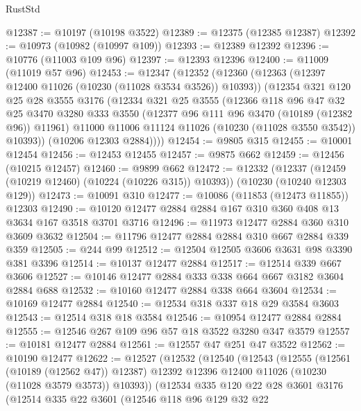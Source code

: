 \begin{lexlean}{RustStd}
\begin{coremodule}
@12387 := @10197 (@10198 @3522)
@12389 := @12375 (@12385 @12387)
@12392 := @10973 (@10982 (@10997 @109))
@12393 := @12389 @12392
@12396 := @10776 (@11003 @109 @96)
@12397 := @12393 @12396
@12400 := @11009 (@11019 @57 @96)
@12453 := @12347
    (@12352
      (@12360
        (@12363 (@12397 @12400 @11026 (@10230 (@11028 @3534 @3526)) @10393))
        (@12354
          @321
          @120
          @25
          @28
          @3555
          @3176
          (@12334
            @321
            @25
            @3555
            (@12366
              @118
              @96
              @47
              @32
              @25
              @3470
              @3280
              @333
              @3550
              (@12377 @96 @111 @96 @3470 (@10189 (@12382 @96)) @11961)
              @11000
              @11006
              @11124
              @11026
              (@10230 (@11028 @3550 @3542))
              @10393))
          (@10206 @12303 @2884))))
@12454 := @9805 @315
@12455 := @10001 @12454
@12456 := @12453 @12455
@12457 := @9875 @662
@12459 := @12456 (@10215 @12457)
@12460 := @9899 @662
@12472 := @12332
    (@12337 (@12459 (@10219 @12460) (@10224 (@10226 @315)) @10393))
    (@10230 (@10240 @12303 @129))
@12473 := @10091 @310
@12477 := @10086 (@11853 (@12473 @11855)) @12303
@12490 := @10120 @12477 @2884 @2884 @167 @310 @360 @408 @13 @3634 @167 @3518 @3701 @3716
@12496 := @11973 @12477 @2884 @360 @310 @3609 @3632
@12504 := @11796 @12477 @2884 @2884 @310 @667 @2884 @339 @359
@12505 := @244 @99
@12512 := @12504 @12505 @3606 @3631 @98 @3390 @381 @3396
@12514 := @10137 @12477 @2884
@12517 := @12514 @339 @667 @3606
@12527 := @10146 @12477 @2884 @333 @338 @664 @667 @3182 @3604 @2884 @688
@12532 := @10160 @12477 @2884 @338 @664 @3604
@12534 := @10169 @12477 @2884
@12540 := @12534 @318 @337 @18 @29 @3584 @3603
@12543 := @12514 @318 @18 @3584
@12546 := @10954 @12477 @2884 @2884
@12555 := @12546 @267 @109 @96 @57 @18 @3522 @3280 @347 @3579
@12557 := @10181 @12477 @2884
@12561 := @12557 @47 @251 @47 @3522
@12562 := @10190 @12477
@12622 := @12527
    (@12532
      (@12540
        (@12543
          (@12555
            (@12561 (@10189 (@12562 @47)) @12387)
            @12392
            @12396
            @12400
            @11026
            (@10230 (@11028 @3579 @3573))
            @10393))
        (@12534
          @335
          @120
          @22
          @28
          @3601
          @3176
          (@12514
            @335
            @22
            @3601
            (@12546
              @118
              @96
              @129
              @32
              @22

\end{coremodule}
\end{lexlean}

